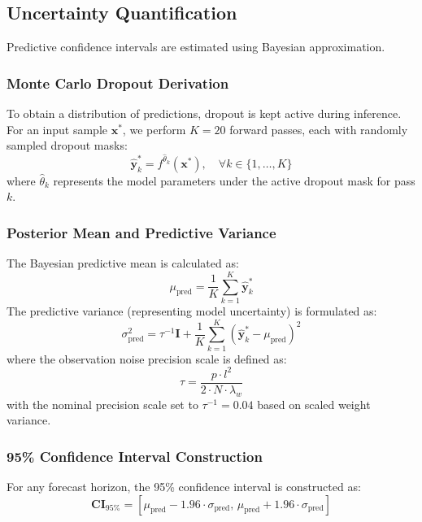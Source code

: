 \documentclass[10pt,journal,compsoc,twocolumn]{IEEEtran}
\begin{document}
\subsection{Uncertainty Quantification}
Predictive confidence intervals are estimated using Bayesian approximation.

\subsubsection{Monte Carlo Dropout Derivation}
To obtain a distribution of predictions, dropout is kept active during inference. For an input sample $\mathbf{x}^*$, we perform $K = 20$ forward passes, each with randomly sampled dropout masks:
\begin{equation}
\hat{\mathbf{y}}_k^* = f^{\hat{\theta}_k}\left(\mathbf{x}^*\right), \quad \forall k \in \{1, \dots, K\}
\end{equation}
where $\hat{\theta}_k$ represents the model parameters under the active dropout mask for pass $k$.

\subsubsection{Posterior Mean and Predictive Variance}
The Bayesian predictive mean is calculated as:
\begin{equation}
\mu_{\text{pred}} = \frac{1}{K} \sum_{k=1}^K \hat{\mathbf{y}}_k^*
\end{equation}
The predictive variance (representing model uncertainty) is formulated as:
\begin{equation}
\sigma_{\text{pred}}^2 = \tau^{-1} \mathbf{I} + \frac{1}{K} \sum_{k=1}^K \left( \hat{\mathbf{y}}_k^* - \mu_{\text{pred}} \right)^2
\end{equation}
where the observation noise precision scale is defined as:
\begin{equation}
\tau = \frac{p \cdot l^2}{2 \cdot N \cdot \lambda_w}
\end{equation}
with the nominal precision scale set to $\tau^{-1} = 0.04$ based on scaled weight variance.

\subsubsection{95\% Confidence Interval Construction}
For any forecast horizon, the 95\% confidence interval is constructed as:
\begin{equation}
\mathbf{CI}_{95\%} = \left[ \mu_{\text{pred}} - 1.96 \cdot \sigma_{\text{pred}}, \, \mu_{\text{pred}} + 1.96 \cdot \sigma_{\text{pred}} \right]
\end{equation}
\end{document}
